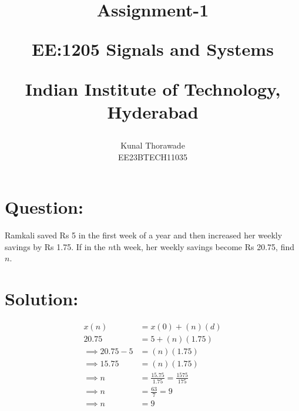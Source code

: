 \documentclass[journal,12pt,twocolumn]{IEEEtran}
\theoremstyle{remark}
\begin{document}
%




\vspace{3cm}

\title{
Assignment-1 

\large{EE:1205 Signals and Systems}

Indian Institute of Technology, Hyderabad
}
\author{Kunal Thorawade

EE23BTECH11035
}	

\maketitle


\newpage


\bigskip
 
\renewcommand{\thefigure}{\theenumi}
\renewcommand{\thetable}{\theenumi}
\begin{flushleft}

\section{\Large Question:}  Ramkali saved Rs 5 in the first week of a year and then increased her weekly savings by Rs 1.75. If in the $n$th week, her weekly savings become Rs 20.75, find $n$.

\section{\Large Solution:} 


\end{flushleft}
\begin{center}

\begin{align} 
x(n) &= x(0) + (n)(d)
\\ 20.75 &= 5 + (n)(1.75)  
 \\ \implies 20.75 - 5 &= (n)( 1.75)
\\ \implies 15.75 &= (n)(1.75)
\\ \implies n &= \frac{15.75}{1.75} = \frac{1575}{175} 
\\ \implies n &= \frac{63}{7} = 9
\\ \implies n &= 9
\end{align}
\end{center}
\end{document}

